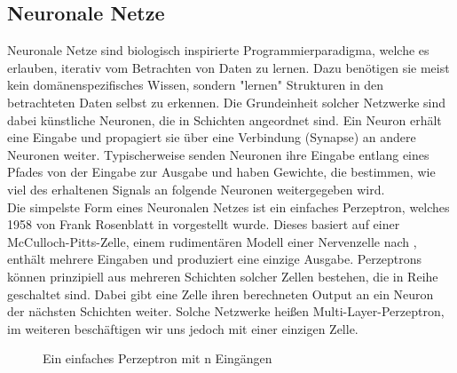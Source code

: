 \subsection{Neuronale Netze}
Neuronale Netze sind biologisch inspirierte Programmierparadigma, welche es erlauben, iterativ vom Betrachten von Daten zu lernen. Dazu benötigen sie meist kein domänenspezifisches Wissen, sondern "lernen" Strukturen in den betrachteten Daten selbst zu erkennen. Die Grundeinheit solcher Netzwerke sind dabei künstliche Neuronen, die in Schichten angeordnet sind. Ein Neuron erhält eine Eingabe und propagiert sie über eine Verbindung (Synapse) an andere Neuronen weiter. Typischerweise senden Neuronen ihre Eingabe entlang eines Pfades von der Eingabe zur Ausgabe und haben Gewichte, die bestimmen, wie viel des erhaltenen Signals an folgende Neuronen weitergegeben wird.\\
Die simpelste Form eines Neuronalen Netzes ist ein einfaches Perzeptron, welches 1958 von Frank Rosenblatt in \cite{rosenblatt1958perceptron} vorgestellt wurde. Dieses basiert auf einer McCulloch-Pitts-Zelle, einem rudimentären Modell einer Nervenzelle nach \cite{mcculloch1943logical}, enthält mehrere Eingaben und produziert eine einzige Ausgabe. Perzeptrons können prinzipiell aus mehreren Schichten solcher Zellen bestehen, die in Reihe geschaltet sind. Dabei gibt eine Zelle ihren berechneten Output an ein Neuron der nächsten Schichten weiter. Solche Netzwerke heißen Multi-Layer-Perzeptron, im weiteren beschäftigen wir uns jedoch mit einer einzigen Zelle.
\begin{figure}[!h]
	\centering
	\caption{Ein einfaches Perzeptron mit n Eingängen}
\end{figure}
